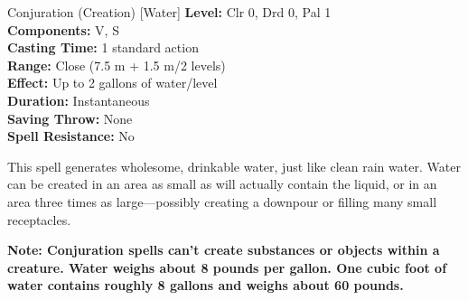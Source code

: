 {Conjuration (Creation) [Water]}
{
	\textbf{Level:}
	Clr 0, Drd 0, Pal 1\\
	\textbf{Components:}
	V, S\\
	\textbf{Casting Time:}
	1 standard action\\
	\textbf{Range:}
	Close (7.5 m + 1.5 m/2 levels)\\
	\textbf{Effect:}
	Up to 2 gallons of water/level\\
	\textbf{Duration:}
	Instantaneous\\
	\textbf{Saving Throw:}
	None\\
	\textbf{Spell Resistance:}
	No\\
}
{
	This spell generates wholesome, drinkable water, just like clean rain water. Water can be created in an area as small as will actually contain the liquid, or in an area three times as large---possibly creating a downpour or filling many small receptacles.

	\textbf{Note: Conjuration spells can't create substances or objects within a creature. Water weighs about 8 pounds per gallon. One cubic foot of water contains roughly 8 gallons and weighs about 60 pounds.}

}
